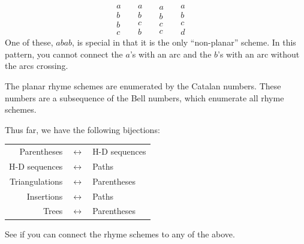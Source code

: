 \documentclass[10pt,]{book}
\theoremstyle{plain}
\theoremstyle{definition}
\theoremstyle{definition}
\theoremstyle{definition}
\theoremstyle{definition}
\numberwithin{equation}{chapter}
\begin{document}
\begin{equation*}
\begin{matrix} a \\ b \\ b \\ c \end{matrix} \quad ~
\begin{matrix} a \\ b \\ c \\ b \end{matrix} \quad ~
\begin{matrix} a \\ b \\ c \\ c \end{matrix} \quad ~
\begin{matrix} a \\ b \\ c \\ d \end{matrix} \quad ~
\end{equation*}
One of these, \(abab\), is special in that it is the only ``non-planar'' scheme. In this pattern, you cannot connect the \(a\)'s with an arc and the \(b\)'s with an arc without the arcs crossing.%
\par
\hypertarget{p-912}{}%
The planar rhyme schemes are enumerated by the Catalan numbers. These numbers are a subsequence of the Bell numbers, which enumerate all rhyme schemes.%
\par
\hypertarget{p-913}{}%
Thus far, we have the following bijections: \begin{sidebyside}{1}{0}{0}{0}
\begin{sbspanel}{1}
{\centering%
\begin{tabular}{rcl}
Parentheses&\(\leftrightarrow\)&H-D sequences\tabularnewline[0pt]
H-D sequences&\(\leftrightarrow\)&Paths\tabularnewline[0pt]
Triangulations&\(\leftrightarrow\)&Parentheses\tabularnewline[0pt]
Insertions&\(\leftrightarrow\)&Paths\tabularnewline[0pt]
Trees&\(\leftrightarrow\)&Parentheses
\end{tabular}
\par}
\end{sbspanel}
\end{sidebyside}
 See if you can connect the rhyme schemes to any of the above.%
\end{document}
